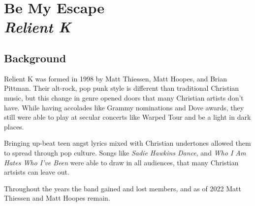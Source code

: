 \documentclass[10pt,a4paper,oneside,twocolumn]{book}
\newcommand\Chapter[2]{
  \chapter[#1: {\itshape#2}]{#1\\[2ex]\Large\itshape#2}
}
\begin{document}
\Chapter{Be My Escape}{Relient K}
\section{Background}
Relient K was formed in 1998 by Matt Thiessen, Matt Hoopes, and Brian Pittman. Their alt-rock, pop punk style is different than traditional Christian music, but this change in genre opened doors that many Christian artists don't have. While having accolades like Grammy nominations and Dove awards, they still were able to play at secular concerts like Warped Tour and be a light in dark places.

Bringing up-beat teen angst lyrics mixed with Christian undertones allowed them to spread through pop culture. Songs like \textit{Sadie Hawkins Dance}, and \textit{Who I Am Hates Who I've Been} were able to draw in all audiences, that many Christian artsists can leave out.

Throughout the years the band gained and lost members, and as of 2022 Matt Thiessen and Matt Hoopes remain. 
\end{document}
